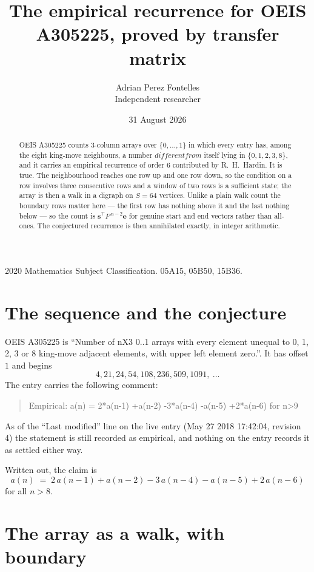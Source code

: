 \documentclass[11pt,a4paper]{article}
\title{The empirical recurrence for OEIS A305225, proved by transfer matrix}
\author{Adrian Perez Fontelles\\ \small Independent researcher}
\date{31 August 2026}
\theoremstyle{plain}
\theoremstyle{definition}
\begin{document}
\maketitle

\begin{abstract}
OEIS A305225 counts $3$-column arrays over $\{0,\dots,1\}$ in which every entry has,
among the eight king-move neighbours, a number $different from$ itself lying in $\{0,1,2,3,8\}$, and it carries an empirical
recurrence of order $6$ contributed by R.~H.~Hardin. It is true. The neighbourhood
reaches one row up and one row down, so the condition on a row involves three consecutive
rows and a window of two rows is a sufficient state; the array is then a walk in a digraph
on $S=64$ vertices. Unlike a plain walk count the boundary rows matter here --- the first
row has nothing above it and the last nothing below --- so the count is
$\mathbf{s}^{\!\top}P^{\,n-2}\mathbf{e}$ for genuine start and end vectors rather than
all-ones. The conjectured recurrence is then annihilated exactly, in integer arithmetic.
\end{abstract}

\noindent\small 2020 Mathematics Subject Classification. 05A15, 05B50, 15B36.\normalsize

\section{The sequence and the conjecture}

OEIS A305225 is ``Number of nX3 0..1 arrays with every element unequal to 0, 1, 2, 3 or 8 king-move adjacent elements, with upper left element zero.''. It has offset
$1$ and begins
\[
4, 21, 24, 54, 108, 236, 509, 1091,\ \dots
\]
The entry carries the following comment:
\begin{quote}\small
Empirical: a(n) = 2*a(n-1) +a(n-2) -3*a(n-4) -a(n-5) +2*a(n-6) for n>9
\end{quote}
As of the ``Last modified'' line on the live entry (May 27 2018 17:42:04, revision
4) the statement is still recorded as empirical, and nothing on the entry
records it as settled either way.

Written out, the claim is
\begin{equation}\label{eq:conj}
a(n)\;=\;2\,a(n-1) + a(n-2) - 3\,a(n-4) - a(n-5) + 2\,a(n-6)
\end{equation}
for all $n>8$.

\section{The array as a walk, with boundary}
\end{document}
